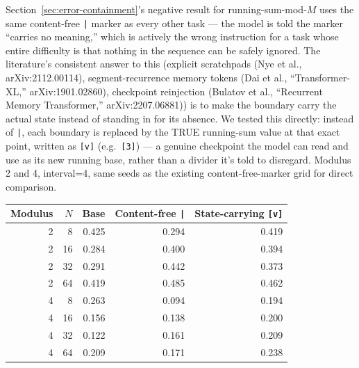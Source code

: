 \documentclass[11pt]{article}
\begin{document}
Section~\ref{sec:error-containment}'s negative result for running-sum-mod-$M$ uses the same content-free \texttt{|} marker as every other task --- the model is told the marker ``carries no meaning,'' which is actively the wrong instruction for a task whose entire difficulty is that nothing in the sequence can be safely ignored. The literature's consistent answer to this (explicit scratchpads (Nye et al., arXiv:2112.00114), segment-recurrence memory tokens (Dai et al., ``Transformer-XL,'' arXiv:1901.02860), checkpoint reinjection (Bulatov et al., ``Recurrent Memory Transformer,'' arXiv:2207.06881)) is to make the boundary carry the actual state instead of standing in for its absence. We tested this directly: instead of \texttt{|}, each boundary is replaced by the TRUE running-sum value at that exact point, written as \texttt{[v]} (e.g.\ \texttt{[3]}) --- a genuine checkpoint the model can read and use as its new running base, rather than a divider it's told to disregard. Modulus 2 and 4, interval=4, same seeds as the existing content-free-marker grid for direct comparison.

\begin{table}[htbp]
\centering
\small
\begin{tabular}{rrrrr}
\toprule
Modulus & $N$ & Base & Content-free \texttt{|} & State-carrying \texttt{[v]} \\
\midrule
2 & 8  & 0.425 & 0.294 & 0.419 \\
2 & 16 & 0.284 & 0.400 & 0.394 \\
2 & 32 & 0.291 & 0.442 & 0.373 \\
2 & 64 & 0.419 & 0.485 & 0.462 \\
4 & 8  & 0.263 & 0.094 & 0.194 \\
4 & 16 & 0.156 & 0.138 & 0.200 \\
4 & 32 & 0.122 & 0.161 & 0.209 \\
4 & 64 & 0.209 & 0.171 & 0.238 \\
\bottomrule
\end{tabular}
\end{table}
\end{document}
